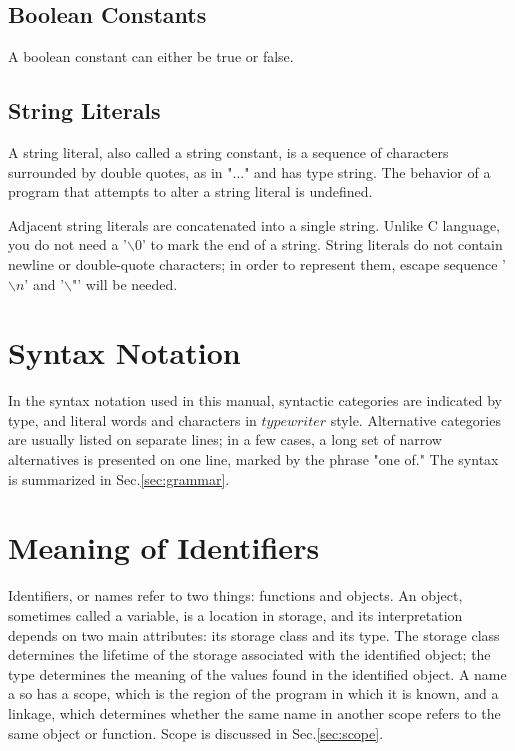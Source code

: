 \documentclass[letterpaper,12pt]{article}
\begin{document}
\subsection{Boolean Constants}
A boolean constant can either be true or false.

\subsection{String Literals}
A string literal, also called a string constant, is a sequence of characters surrounded by double quotes, as in "..." and has type string. The behavior of a program that attempts to alter a string literal is undefined. \newline

Adjacent string literals are concatenated into a single string. Unlike C language, you do not need a '$\backslash 0$' to mark the end of a string. String literals do not contain newline or double-quote characters; in order to represent them, escape sequence '$\backslash n$' and '$\backslash$"' will be needed.\newline

\section{Syntax Notation}
In the syntax notation used in this manual, syntactic categories are indicated by {} type, and literal words and characters in $typewriter$ style. Alternative categories are usually listed on separate lines; in a few cases, a long set of narrow alternatives is presented on one line, marked by the phrase "one of." The syntax is summarized in Sec.\ref{sec:grammar}.

\section{Meaning of Identifiers}
Identifiers, or names refer to two things: functions and objects. An object, sometimes called a variable, is a location in storage, and its interpretation depends on two main attributes: its storage class and its type. The storage class determines the lifetime of the storage associated with the identified object; the type determines the meaning of the values found in the identified object. A name a so has a scope, which is the region of the program in which it is known, and a linkage, which determines whether the same name in another scope refers to the same object or function. Scope is discussed in Sec.\ref{sec:scope}.
\end{document}
